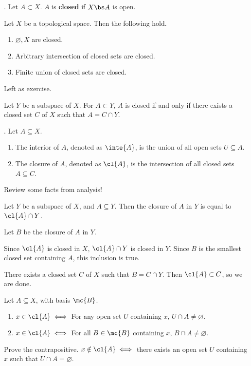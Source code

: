 
.  Let \(A \subset X\). \(A\) is \textbf{closed} if \(X \bs A\) is open.

 Let \(X\) be a topological space. Then the following hold.
\begin{enumerate}
    \item \(\varnothing, X\) are closed.
    \item Arbitrary intersection of closed sets are closed.
    \item Finite union of closed sets are closed.
\end{enumerate}

\pf Left as exercise.

 Let \(Y\) be a subspace of \(X\). For \(A \subset Y\), \(A\) is closed if and only if there exists a closed set \(C\) of \(X\) such that \(A = C \cap Y\).

.  Let \(A \subseteq X\).
\begin{enumerate}
    \item The interior of \(A\), denoted as \(\inte{A}\), is the union of all open sets \(U \subseteq A\).
    \item The closure of \(A\), denoted as \(\cl{A}\), is the intersection of all closed sets \(A \subseteq C\).
\end{enumerate}

Review some facts from analysis!

 Let \(Y\) be a subspace of \(X\), and \(A \subseteq Y\). Then the closure of \(A\) in \(Y\) is equal to \(\cl{A} \cap Y\).

\pf Let \(B\) be the closure of \(A\) in \(Y\).

\note{\(\subset\)} Since \(\cl{A}\) is closed in \(X\), \(\cl{A} \cap Y\) is closed in \(Y\). Since \(B\) is the smallest closed set containing \(A\), this inclusion is true.

\note{\(\supset\)} There exists a closed set \(C\) of \(X\) such that \(B = C \cap Y\). Then \(\cl{A} \subset C\), so we are done.

 Let \(A \subseteq X\), with basis \(\mc{B}\).
\begin{enumerate}
    \item \(x \in \cl{A} \iff\) For any open set \(U\) containing \(x\), \(U \cap A \neq \varnothing\).
          \item\(x \in \cl{A} \iff\) For all \(B \in \mc{B}\) containing \(x\), \(B \cap A \neq \varnothing\).
\end{enumerate}

\pf {} Prove the contrapositive. \(x \notin \cl{A} \iff\) there exists an open set \(U\) containing \(x\) such that \(U \cap A = \varnothing\).
\pagebreak
